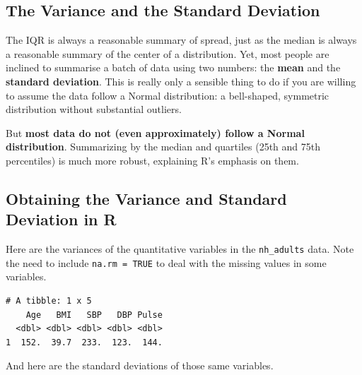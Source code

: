 \documentclass[
]{book}
\newenvironment{Shaded}{\begin{snugshade}}{\end{snugshade}}
\newcommand{\DataTypeTok}[1]{\textcolor[rgb]{0.13,0.29,0.53}{#1}}
\newcommand{\KeywordTok}[1]{\textcolor[rgb]{0.13,0.29,0.53}{\textbf{#1}}}
\newcommand{\NormalTok}[1]{#1}
\newcommand{\OperatorTok}[1]{\textcolor[rgb]{0.81,0.36,0.00}{\textbf{#1}}}
\newcommand{\OtherTok}[1]{\textcolor[rgb]{0.56,0.35,0.01}{#1}}
\newcommand{\StringTok}[1]{\textcolor[rgb]{0.31,0.60,0.02}{#1}}
\begin{document}
\hypertarget{the-variance-and-the-standard-deviation}{%
\subsection{The Variance and the Standard Deviation}\label{the-variance-and-the-standard-deviation}}

The IQR is always a reasonable summary of spread, just as the median is always a reasonable summary of the center of a distribution. Yet, most people are inclined to summarise a batch of data using two numbers: the \textbf{mean} and the \textbf{standard deviation}. This is really only a sensible thing to do if you are willing to assume the data follow a Normal distribution: a bell-shaped, symmetric distribution without substantial outliers.

But \textbf{most data do not (even approximately) follow a Normal distribution}. Summarizing by the median and quartiles (25th and 75th percentiles) is much more robust, explaining R's emphasis on them.

\hypertarget{obtaining-the-variance-and-standard-deviation-in-r}{%
\subsection{Obtaining the Variance and Standard Deviation in R}\label{obtaining-the-variance-and-standard-deviation-in-r}}

Here are the variances of the quantitative variables in the \texttt{nh\_adults} data. Note the need to include \texttt{na.rm\ =\ TRUE} to deal with the missing values in some variables.

\begin{Shaded}
\end{Shaded}

\begin{verbatim}
# A tibble: 1 x 5
    Age   BMI   SBP   DBP Pulse
  <dbl> <dbl> <dbl> <dbl> <dbl>
1  152.  39.7  233.  123.  144.
\end{verbatim}

And here are the standard deviations of those same variables.

\begin{Shaded}
\end{Shaded}
\end{document}
